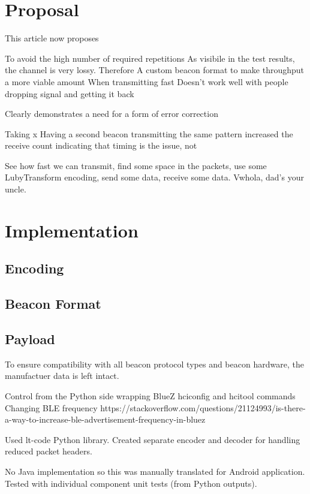 \documentclass[conference]{IEEEtran} %
\begin{document}
\section{Proposal}
This article now proposes 

To avoid the high number of required repetitions 
As visibile in the test results, the channel is very lossy. Therefore 
A custom beacon format
to make throughput  a more viable amount 
When transmitting fast 
Doesn't work well with people dropping signal and getting it back

Clearly demonstrates a need for a form of error correction

Taking x
Having a second beacon transmitting the same pattern increased the receive count indicating that timing is the issue, not 


See how fast we can transmit, find some space in the packets, use some LubyTransform encoding, send some data, receive some data. Vwhola, dad's your uncle.


\section{Implementation}

\subsection{Encoding}

\subsection{Beacon Format}


\subsection{Payload}



To ensure compatibility with all beacon protocol types and beacon hardware, the manufactuer data is left intact.


Control from the Python side wrapping BlueZ hciconfig and hcitool commands 
Changing BLE frequency https://stackoverflow.com/questions/21124993/is-there-a-way-to-increase-ble-advertisement-frequency-in-bluez


Used lt-code Python library. Created separate encoder and decoder for handling reduced packet headers. 

No Java implementation so this was manually translated for Android application. Tested with individual component unit tests (from Python outputs).
\end{document}
